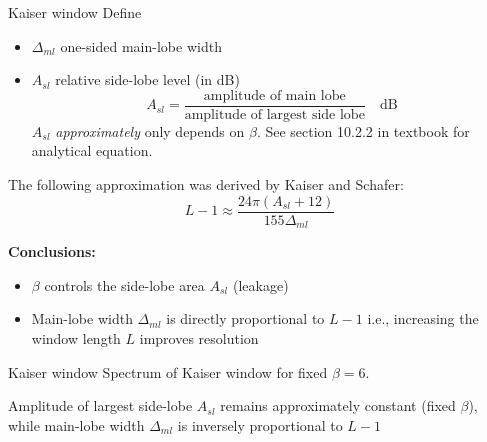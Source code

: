 \documentclass[10pt, aspectratio=169, handout]{beamer}
\begin{document}
%
\begin{frame}{Kaiser window}
Define
\begin{itemize}
	\item $\Delta_{ml}$ one-sided main-lobe width
	\item $A_{sl}$ relative side-lobe level (in dB)
	\begin{equation*}
		A_{sl} = \frac{\text{amplitude of main lobe}}{\text{amplitude of largest side lobe}}\quad\text{dB}
	\end{equation*} 
	$A_{sl}$ \textit{approximately} only depends on $\beta$. See section 10.2.2 in textbook for analytical equation.
\end{itemize}

The following approximation was derived by Kaiser and Schafer:
\begin{equation*}
	L - 1 \approx \frac{24\pi(A_{sl}+12)}{155\Delta_{ml}}
\end{equation*}

\textbf{Conclusions:}
\begin{itemize}
	\item $\beta$ controls the side-lobe area $A_{sl}$ (leakage)
	\item Main-lobe width $\Delta_{ml}$ is directly proportional to $L-1$ i.e., increasing the window length $L$ improves resolution
\end{itemize}
\end{frame}

%
\begin{frame}{Kaiser window}
Spectrum of Kaiser window for fixed $\beta = 6$.

Amplitude of largest side-lobe $A_{sl}$ remains approximately constant (fixed $\beta$), while main-lobe width $\Delta_{ml}$ is inversely proportional to $L-1$

\begin{center}
	\resizebox{0.5\textwidth}{!}{}
\end{center}

\end{frame}
\end{document}

